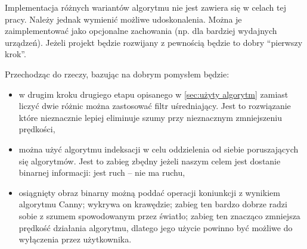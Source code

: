 Implementacja różnych wariantów algorytmu nie jest zawiera się w celach tej pracy. Należy jednak wymienić możliwe udoskonalenia. Można je zaimplementować jako opcjonalne zachowania (np. dla bardziej wydajnych urządzeń). Jeżeli projekt będzie rozwijany z pewnością będzie to dobry ``pierwszy krok''.

Przechodząc do rzeczy, bazując na \cite{Motiondet} dobrym pomysłem będzie:

\begin{itemize}
	\item w drugim kroku drugiego etapu opisanego w \ref{sec:użyty algorytm} zamiast liczyć dwie różnic można zastosować filtr uśredniający. Jest to rozwiązanie które nieznacznie lepiej eliminuje szumy przy nieznacznym zmniejszeniu prędkości,
	
	\item można użyć algorytmu indeksacji w celu oddzielenia od siebie poruszających się algorytmów. Jest to zabieg zbędny jeżeli naszym celem jest dostanie binarnej informacji: jest ruch -- nie ma ruchu,
	
	\item osiągnięty obraz binarny możną poddać operacji koniunkcji z wynikiem algorytmu Canny; wykrywa on krawędzie; zabieg ten bardzo dobrze radzi sobie z szumem spowodowanym przez światło; zabieg ten znacząco zmniejsza prędkość działania algorytmu, dlatego jego użycie powinno być możliwe do wyłączenia przez użytkownika. 
	
\end{itemize}



%
